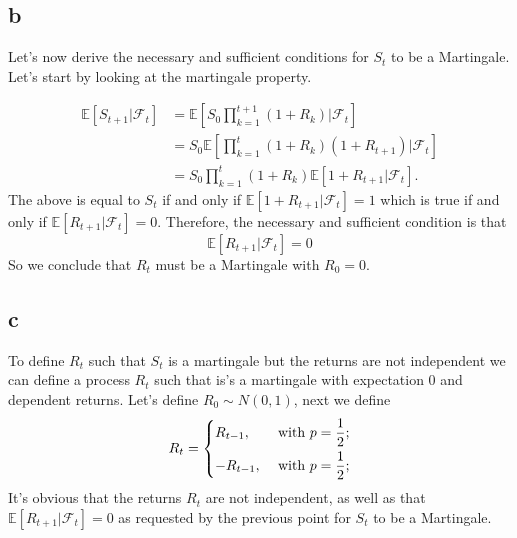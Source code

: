 \documentclass{article}
\begin{document}
\subsection{b}
Let's now derive the necessary and sufficient conditions for \(S_t\) to be a Martingale. Let's start by looking at the martingale property.

\begin{align*}
  \mathbb{E} \left[ S_{t+1} |\mathcal{F}_t \right] & = \mathbb{E} \left[ S_0 \prod_{k=1} ^{t+1}(1+R_k)|\mathcal{F}_t \right]          \\
                                                   & = S_0 \mathbb{E} \left[ \prod_{k=1}^t (1+R_k) (1+R_{t+1}) |\mathcal{F}_t \right] \\
                                                   & = S_0 \prod_{k=1}^t (1+R_k) \mathbb{E} \left[ 1+R_{t+1} |\mathcal{F}_t \right] .
\end{align*}
The above is equal to \(S_t\) if and only if \(\mathbb{E} \left[ 1+R_{t+1} |\mathcal{F}_t \right] = 1\) which is true if and only if \(\mathbb{E} \left[ R_{t+1}| \mathcal{F}_t \right] = 0\).
Therefore, the necessary and sufficient condition is that
\begin{equation}
  \mathbb{E} \left[ R_{t+1}|\mathcal{F}_t \right] = 0
\end{equation}
So we conclude that \(R_t\) must be a Martingale with \(R_0 = 0\).


\subsection{c}
To define \(R_t\) such that \(S_t\) is a martingale but the returns are not independent we can define a process \(R_t\) such that is's a martingale with expectation 0 and dependent returns.
Let's define \(R_{0}\sim  N(0,1) \), next we define
\begin{equation}
  R_t= \begin{dcases}
    R_{t-1} ,  & \text{ with }  p=\frac{1}{2}; \\
    -R_{t-1} , & \text{ with }  p=\frac{1}{2}; \\
  \end{dcases}
\end{equation}
It's obvious that the returns \(R_t\) are not independent, as well as that \(\mathbb{E} \left[ R_{t+1}| \mathcal{F}_t  \right]=0\) as requested by the previous point for \(S_t\) to be a Martingale.
\end{document}
